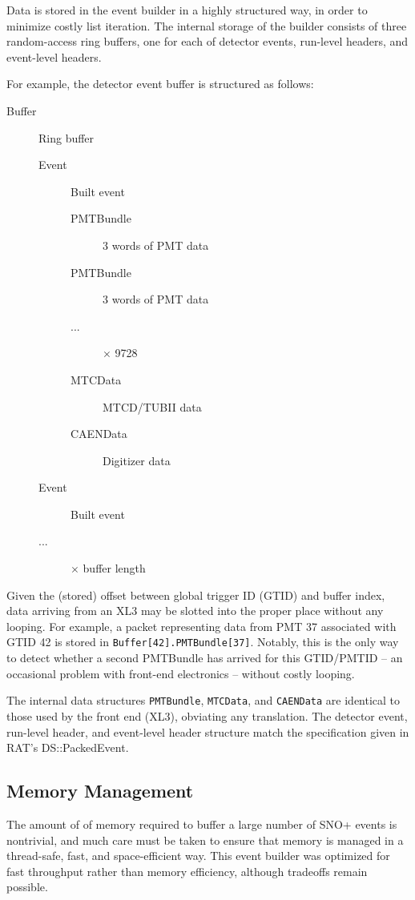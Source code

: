 \documentclass[11pt,twocolumn]{article}
\begin{document}
Data is stored in the event builder in a highly structured way, in order to minimize costly list iteration. The internal storage of the builder consists of three random-access ring buffers, one for each of detector events, run-level headers, and event-level headers.

For example, the detector event buffer is structured as follows:
\begin{description}
\item[Buffer] Ring buffer
\begin{description}
\item[Event] Built event
\begin{description}
\item[PMTBundle] 3 words of PMT data
\item[PMTBundle] 3 words of PMT data
\item[ ...] $\times$ 9728 
\item[MTCData] MTCD/TUBII data
\item[CAENData] Digitizer data
\end{description}
\item[Event] Built event
\item[...] $\times$ buffer length
\end{description}
\end{description}
Given the (stored) offset between global trigger ID (GTID) and buffer index, data arriving from an XL3 may be slotted into the proper place without any looping. For example, a packet representing data from PMT 37 associated with GTID 42 is stored in {\tt Buffer[42].PMTBundle[37]}. Notably, this is the only way to detect whether a second PMTBundle has arrived for this GTID/PMTID -- an occasional problem with front-end electronics -- without costly looping.

The internal data structures {\tt PMTBundle}, {\tt MTCData}, and {\tt CAENData} are identical to those used by the front end (XL3), obviating any translation. The detector event, run-level header, and event-level header structure match the specification given in RAT's DS::PackedEvent.

\subsection{Memory Management}
The amount of of memory required to buffer a large number of SNO+ events is nontrivial, and much care must be taken to ensure that memory is managed in a thread-safe, fast, and space-efficient way. This event builder was optimized for fast throughput rather than memory efficiency, although tradeoffs remain possible.
\end{document}
